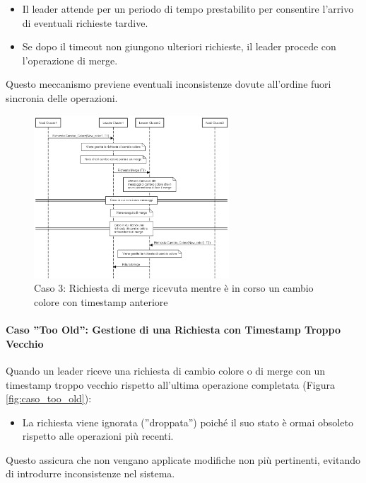 \documentclass[12pt, a4paper]{report}
\begin{document}
\begin{itemize}
    \item Il leader attende per un periodo di tempo prestabilito per consentire l'arrivo di eventuali richieste tardive.
    \item Se dopo il timeout non giungono ulteriori richieste, il leader procede con l'operazione di merge.
\end{itemize}

Questo meccanismo previene eventuali inconsistenze dovute all'ordine fuori sincronia delle operazioni.

\begin{figure}[H]
    \centering
    \includegraphics[width=0.65\textwidth,align=t]{images/concorrenza/caso3.png}
    \caption{Caso 3: Richiesta di merge ricevuta mentre è in corso un cambio colore con timestamp anteriore}
    \label{fig:caso3_concorrenza}
\end{figure}

\newpage
\paragraph{Caso ''Too Old'': Gestione di una Richiesta con Timestamp Troppo Vecchio}\label{par:too_old}


Quando un leader riceve una richiesta di cambio colore o di merge con un timestamp troppo vecchio rispetto all'ultima operazione completata (Figura \ref{fig:caso_too_old}):

\begin{itemize}
    \item La richiesta viene ignorata (''droppata'') poiché il suo stato è ormai obsoleto rispetto alle operazioni più recenti.
\end{itemize}

Questo assicura che non vengano applicate modifiche non più pertinenti, evitando di introdurre inconsistenze nel sistema.
\end{document}
